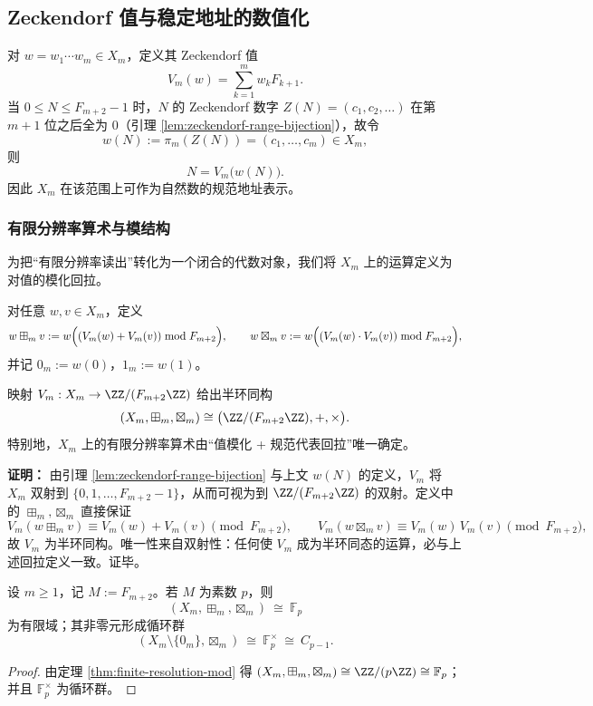 \subsection{Zeckendorf 值与稳定地址的数值化}

对 $w=w_1\cdots w_m\in X_m$，定义其 Zeckendorf 值
\[
V_m(w)=\sum_{k=1}^m w_k F_{k+1}.
\]
当 $0\le N\le F_{m+2}-1$ 时，$N$ 的 Zeckendorf 数字 $Z(N)=(c_1,c_2,\dots)$ 在第 $m+1$ 位之后全为 $0$（引理 \ref{lem:zeckendorf-range-bijection}），故令
\[
w(N):=\pi_m(Z(N))=(c_1,\dots,c_m)\in X_m,
\]
则
\[
N=V_m\bigl(w(N)\bigr).
\]
因此 $X_m$ 在该范围上可作为自然数的规范地址表示。

\subsubsection{有限分辨率算术与模结构}
为把“有限分辨率读出”转化为一个闭合的代数对象，我们将 $X_m$ 上的运算定义为对值的模化回拉。

\begin{definition}[有限分辨率算术]
对任意 $w,v\in X_m$，定义
\[
w\boxplus_m v:=w\Bigl((V_m(w)+V_m(v))\bmod F_{m+2}\Bigr),
\qquad
w\boxtimes_m v:=w\Bigl((V_m(w)\cdot V_m(v))\bmod F_{m+2}\Bigr),
\]
并记 $0_m:=w(0)$，$1_m:=w(1)$。
\end{definition}

\begin{theorem}[有限分辨率算术的模结构]
\label{thm:finite-resolution-mod}
映射 $V_m:X_m\to\ZZ/(F_{m+2}\ZZ)$ 给出半环同构
\[
(X_m,\boxplus_m,\boxtimes_m)\cong\bigl(\ZZ/(F_{m+2}\ZZ),+,\times\bigr).
\]
特别地，$X_m$ 上的有限分辨率算术由“值模化 + 规范代表回拉”唯一确定。
\end{theorem}

\textbf{证明：}
由引理 \ref{lem:zeckendorf-range-bijection} 与上文 $w(N)$ 的定义，$V_m$ 将 $X_m$ 双射到 $\{0,1,\dots,F_{m+2}-1\}$，从而可视为到 $\ZZ/(F_{m+2}\ZZ)$ 的双射。定义中的 $\boxplus_m,\boxtimes_m$ 直接保证
\[
V_m(w\boxplus_m v)\equiv V_m(w)+V_m(v)\pmod{F_{m+2}},
\qquad
V_m(w\boxtimes_m v)\equiv V_m(w)\,V_m(v)\pmod{F_{m+2}},
\]
故 $V_m$ 为半环同构。唯一性来自双射性：任何使 $V_m$ 成为半环同态的运算，必与上述回拉定义一致。证毕。

\begin{corollary}\label{cor:field-phase-fib-prime}
设 $m\ge 1$，记 $M:=F_{m+2}$。若 $M$ 为素数 $p$，则
\[
(X_m,\boxplus_m,\boxtimes_m)\ \cong\ \mathbb{F}_p
\]
为有限域；其非零元形成循环群
\[
(X_m\setminus\{0_m\},\boxtimes_m)\ \cong\ \mathbb{F}_p^\times\ \cong\ C_{p-1}.
\]
\end{corollary}
\begin{proof}
由定理 \ref{thm:finite-resolution-mod} 得 $(X_m,\boxplus_m,\boxtimes_m)\cong \ZZ/(p\ZZ)\cong \mathbb{F}_p$；并且 \(\mathbb{F}_p^\times\) 为循环群。
\end{proof}

